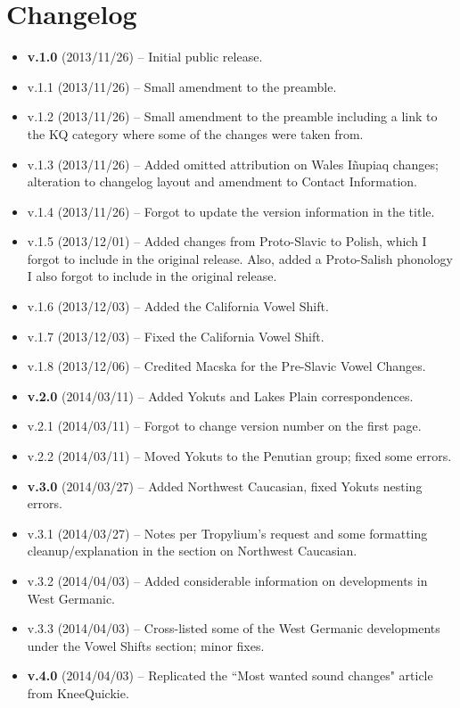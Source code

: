 \section{Changelog}
\begin{itemize}
\item \textbf{v.1.0} (2013/11/26) -- Initial public release.
\item v.1.1 (2013/11/26) -- Small amendment to the preamble.
\item v.1.2 (2013/11/26) -- Small amendment to the preamble including a link to the KQ category where some of the changes were taken from.
\item v.1.3 (2013/11/26) -- Added omitted attribution on Wales I\~{n}upiaq changes; alteration to changelog layout and amendment to Contact Information.
\item v.1.4 (2013/11/26) -- Forgot to update the version information in the title.
\item v.1.5 (2013/12/01) -- Added changes from Proto-Slavic to Polish, which I forgot to include in the original release. Also, added a Proto-Salish phonology I also forgot to include in the original release.
\item v.1.6 (2013/12/03) -- Added the California Vowel Shift.
\item v.1.7 (2013/12/03) -- Fixed the California Vowel Shift.
\item v.1.8 (2013/12/06) -- Credited Macska for the Pre-Slavic Vowel Changes.
\item \textbf{v.2.0} (2014/03/11) -- Added Yokuts and Lakes Plain correspondences.
\item v.2.1 (2014/03/11) -- Forgot to change version number on the first page.
\item v.2.2 (2014/03/11) -- Moved Yokuts to the Penutian group; fixed some errors.
\item \textbf{v.3.0} (2014/03/27) -- Added Northwest Caucasian, fixed Yokuts nesting errors.
\item v.3.1 (2014/03/27) -- Notes per Tropylium's request and some formatting cleanup/explanation in the section on Northwest Caucasian.
\item v.3.2 (2014/04/03) -- Added considerable information on developments in West Germanic.
\item v.3.3 (2014/04/03) -- Cross-listed some of the West Germanic developments under the Vowel Shifts section; minor fixes.
\item \textbf{v.4.0} (2014/04/03) -- Replicated the ``Most wanted sound changes" article from KneeQuickie.

\end{itemize}
